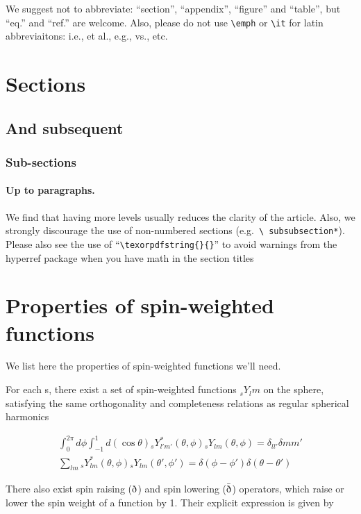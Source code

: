 \documentclass[a4paper,11pt]{article}
\newcommand{\sr}{\text{\normalfont\dh}}
\renewcommand{\sl}{\bar{\text{\normalfont\dh}}}
\begin{document}
We suggest not to abbreviate: ``section'', ``appendix'', ``figure''
and ``table'', but ``eq.'' and ``ref.'' are welcome. Also, please do
not use \texttt{\textbackslash emph} or \texttt{\textbackslash it} for
latin abbreviaitons: i.e., et al., e.g., vs., etc.



\section{Sections}
\subsection{And subsequent}
\subsubsection{Sub-sections}
\paragraph{Up to paragraphs.} We find that having more levels usually
reduces the clarity of the article. Also, we strongly discourage the
use of non-numbered sections (e.g.~\texttt{\textbackslash
  subsubsection*}).  Please also see the use of
``\texttt{\textbackslash texorpdfstring\{\}\{\}}'' to avoid warnings
from the hyperref package when you have math in the section titles



\appendix

\section{Properties of spin-weighted functions}
We list here the properties of spin-weighted functions we'll need. 

For each s, there exist a set of spin-weighted functions $_sY_lm$ on the sphere, satisfying the same orthogonality and completeness relations as regular spherical harmonics

\begin{align}
\int_0^{2\pi} d\phi \int_{-1}^{1} d(\cos{\theta}) {}_sY_{l'm'}^*(\theta,\phi){}_sY_{lm}(\theta,\phi) = \delta_{ll'}\delta{mm'} \\
\sum_{lm} {}_sY_{lm}^*(\theta,\phi){}_sY_{lm}(\theta',\phi')=\delta(\phi-\phi')\delta(\theta-\theta')
\end{align}

There also exist spin raising ($\sr$) and spin lowering ($\sl$) operators, which raise or lower the spin weight of a function by 1. Their explicit expression is given by
\end{document}
